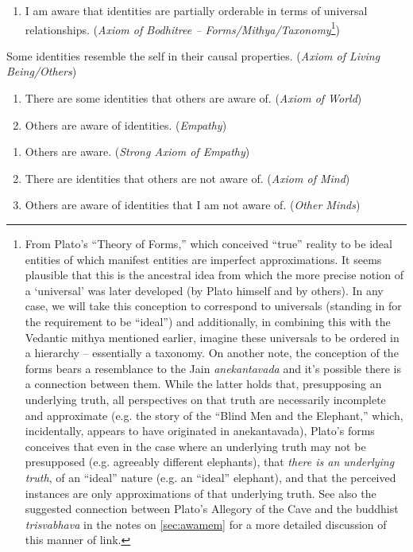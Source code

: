 \documentclass[pra,twocolumn,groupedaddress,10pt]{revtex4}
\theoremstyle{definition}
\begin{document}
\begin{enumerate}[label={[\textbf{\arabic*}]},start=0]
\begin{enumerate}
			\item I am aware that identities are partially orderable in terms of universal relationships. (\emph{Axiom of Bodhitree -- Forms/Mithya/Taxonomy}\footnote{From Plato's ``Theory of Forms,'' which conceived ``true'' reality to be ideal entities of which manifest entities are imperfect approximations. It seems plausible that this is the ancestral idea from which the more precise notion of a `universal' was later developed (by Plato himself and by others). In any case, we will take this conception to correspond to universals (standing in for the requirement to be ``ideal'') and additionally, in combining this with the Vedantic mithya mentioned earlier, imagine these universals to be ordered in a hierarchy -- essentially a taxonomy. On another note, the conception of the forms bears a resemblance to the Jain \emph{anekantavada} and it's possible there is a connection between them. While the latter holds that, presupposing an underlying truth, all perspectives on that truth are necessarily incomplete and approximate (e.g. the story of the ``Blind Men and the Elephant,'' which, incidentally, appears to have originated in anekantavada), Plato's forms conceives that even in the case where an underlying truth may not be presupposed (e.g. agreeably different elephants), that \emph{there is an underlying truth}, of an ``ideal'' nature (e.g. an ``ideal'' elephant), and that the perceived instances are only approximations of that underlying truth. See also the suggested connection between Plato's Allegory of the Cave and the buddhist \emph{trisvabhava} in the notes on \autoref{sec:awamem} for a more detailed discussion of this manner of link.})
		\end{enumerate}
	\item Some identities resemble the self in their causal properties. (\emph{Axiom of Living Being/Others})
	\item \begin{enumerate}
			\item There are some identities that others are aware of. (\emph{Axiom of World})
			\item Others are aware of identities. (\emph{Empathy})
		\end{enumerate}
	\item \begin{enumerate}
			\item Others are aware. (\emph{Strong Axiom of Empathy})
			\item There are identities that others are not aware of. (\emph{Axiom of Mind})
			\item Others are aware of identities that I am not aware of. (\emph{Other Minds})
		\end{enumerate}
\end{enumerate}
\end{document}
